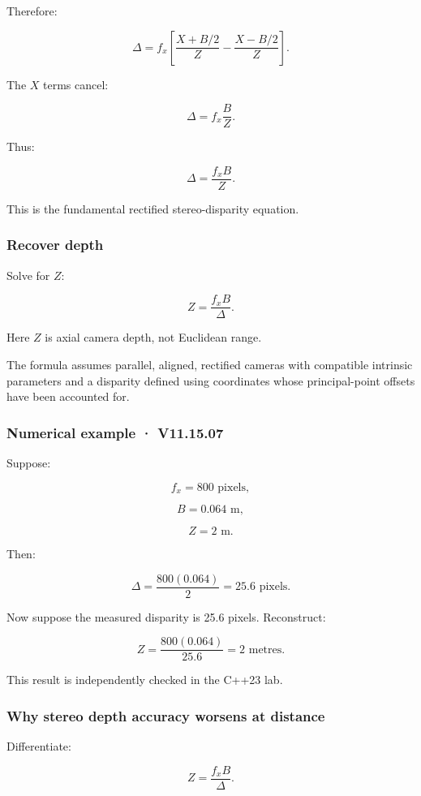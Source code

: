 Therefore:

\[ \Delta = f_x \left[ \frac{X+B/2}{Z} - \frac{X-B/2}{Z} \right]. \]

The \(X\) terms cancel:

\[ \Delta=f_x\frac BZ. \]

Thus:

\[ \boxed{ \Delta=\frac{f_xB}{Z}. } \]

This is the fundamental rectified stereo-disparity equation.

\subsubsection{Recover depth}\label{recover-depth}

Solve for \(Z\):

\[ \boxed{ Z=\frac{f_xB}{\Delta}. } \]

Here \(Z\) is axial camera depth, not Euclidean range.

The formula assumes parallel, aligned, rectified cameras with compatible intrinsic parameters and a disparity defined using coordinates whose principal-point offsets have been accounted for.

\subsubsection{Numerical example · V11.15.07}\label{numerical-example-v11.15.07}

Suppose:

\[ f_x=800\text{ pixels}, \]

\[ B=0.064\text{ m}, \]

\[ Z=2\text{ m}. \]

Then:

\[ \Delta=\frac{800(0.064)}2 =\boxed{25.6\text{ pixels}}. \]

Now suppose the measured disparity is 25.6 pixels. Reconstruct:

\[ Z=\frac{800(0.064)}{25.6} =\boxed{2\text{ metres}}. \]

This result is independently checked in the C++23 lab.

\subsubsection{Why stereo depth accuracy worsens at distance}\label{why-stereo-depth-accuracy-worsens-at-distance}

Differentiate:

\[ Z=\frac{f_xB}{\Delta}. \]

